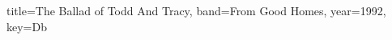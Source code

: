 \documentclass{skrul-leadsheet}
\begin{document}
\begin{song}[transpose-capo=true]{title={The Ballad of Todd And Tracy}, band={From Good Homes}, year={1992}, key={Db}}



\end{song}
\end{document}
